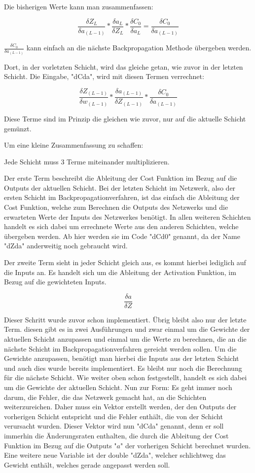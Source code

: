 \documentclass[12pt]{article}
\begin{document}
Die bisherigen Werte kann man zusammenfassen:

$$
\frac{\delta Z_L}{\delta a_{(L-1)}}*
\frac{\delta a_L}{\delta Z_L}*
\frac{\delta C_0}{\delta a_L}
= \frac{\delta C_0}{\delta a_{(L-1)}}
$$

$\frac{\delta C_0}{\delta a_{(L-1)}}$ kann einfach an die nächste Backpropagation Methode übergeben werden.

Dort, in der vorletzten Schicht, wird das gleiche getan, wie zuvor in der letzten Schicht. Die Eingabe, "dCda", wird mit diesen Termen verrechnet:

$$
\frac{\delta Z_{(L-1)}}{\delta w_{(L-1)}}*
\frac{\delta a_{(L-1)}}{\delta Z_{(L-1)}}*
\frac{\delta C_0}{\delta a_{(L-1)}}
$$

Diese Terme sind im Prinzip die gleichen wie zuvor, nur auf die aktuelle Schicht gemünzt. 

Um eine kleine Zusammenfassung zu schaffen:

Jede Schicht muss 3 Terme miteinander multiplizieren. 

Der erste Term beschreibt die Ableitung der Cost Funktion im Bezug auf die Outputs der aktuellen Schicht. Bei der letzten Schicht im Netzwerk, also der ersten Schicht im Backpropagationverfahren, ist das einfach die Ableitung der Cost Funktion, welche zum Berechnen die Outputs des Netzwerks und die erwarteten Werte der Inputs des Netzwerkes benötigt. In allen weiteren Schichten handelt es sich dabei um errechnete Werte aus den anderen Schichten, welche übergeben werden. Ab hier werden sie im Code "dCd0" genannt, da der Name "dZda" anderweitig noch gebraucht wird.

Der zweite Term sieht in jeder Schicht gleich aus, es kommt hierbei lediglich auf die Inputs an. Es handelt sich um die Ableitung der Activation Funktion, im Bezug auf die gewichteten Inputs.

$$\frac{\delta a}{\delta Z}$$

Dieser Schritt wurde zuvor schon implementiert.
Übrig bleibt also nur der letzte Term. diesen gibt es in zwei Ausführungen und zwar einmal um die Gewichte der aktuellen Schicht anzupassen und einmal um die Werte zu berechnen, die an die nächste Schicht im Backpropagationverfahren gereicht werden sollen.
Um die Gewichte anzupassen, benötigt man hierbei die Inputs aus der letzten Schicht und auch dies wurde bereits implementiert. Es bleibt nur noch die Berechnung für die nächste Schicht. Wie weiter oben schon festgestellt, handelt es sich dabei um die Gewichte der aktuellen Schicht. 
Nun zur Form: Es geht immer noch darum, die Fehler, die das Netzwerk gemacht hat, an die Schichten weiterzureichen. Daher muss ein Vektor erstellt werden, der den Outputs der vorherigen Schicht entspricht und die Fehler enthält, die von der Schicht verursacht wurden.
Dieser Vektor wird nun "dCda" genannt, denn er soll immerhin die Änderungsraten enthalten, die durch die Ableitung der Cost Funktion im Bezug auf die Outputs "$a$" der vorherigen Schicht berechnet wurden. Eine weitere neue Variable ist der double "dZda", welcher schlichtweg das Gewicht enthält, welches gerade angepasst werden soll.
\end{document}
